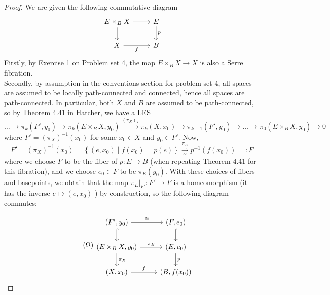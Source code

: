 \documentclass[reqno]{amsart}
\theoremstyle{definition}
\theoremstyle{remark}
\begin{document}
    \begin{proof}
        We are given the following commutative diagram
        \begin{equation*}
        \begin{tikzcd}
            E \times_B X \ar[r] \ar[d] & E \ar[d, "p"] \\
            X \ar[r, "f"'] & B
        \end{tikzcd}
        \end{equation*}
        Firstly, by Exercise 1 on Problem set 4, 
        the map
        $E \times_B X \to X$ is also a
        Serre fibration.\\
        Secondly, by assumption in the conventions section
        for problem set 4, all spaces
        are assumed to be locally path-connected and connected,
        hence all spaces are path-connected. In 
        particular, both $X$ and $B$ are assumed to be
        path-connected, so
        by Theorem 4.41 in Hatcher, we have a LES
        \[
        \ldots \to 
        \pi_k (F',y_0) \to 
        \pi_k(E \times_B X, y_0) 
        \stackrel{(\pi_X)_*}{\to} \pi_k (X,x_0)
        \to \pi_{k-1}(F',y_0) \to \ldots \to 
        \pi_0 \left( E \times_B X, y_0 \right)  \to 0
        \] 
        where
        $F' = \left( \pi_X \right)^{-1}(x_0)$ for
        some $x_0 \in X$
        and $y_0 \in F'$.
        Now,
        \[
        F' = 
        \left( \pi_X \right)^{-1}(x_0)
        = \left\{ \left( e,x_0 \right)  \mid 
        f(x_0) = p(e)  \right\} 
        \xrightarrow[\cong]{\pi_E}  p^{-1}\left( f(x_0) \right) =: 
        F
        \] 
        where we choose $F$ to be
        the fiber of $p \colon E \to B$ (when repeating
        Theorem 4.41 for this fibration), and
        we choose 
        $e_0 \in F$ to be
        $\pi_E (y_0)$.
        With these choices of fibers and basepoints, we
        obtain that the map
        $\pi_E|_{F'} \colon F' \to F$ is a homeomorphism
        (it has the inverse
        $e \mapsto (e, x_0)$ )
        by construction, so the following
        diagram commutes:

        \begin{equation*}\tag{$\Omega$}\label{Omega}
        \begin{tikzcd}
            (F',y_0) \ar[r, "\cong"] \ar[d, hookrightarrow]
            & (F,e_0) \ar[d, hookrightarrow] \\
            (E \times_B X, y_0) \ar[d, "\pi_X"] \ar[r, "\pi_E"]
            & (E,e_0) \ar[d, "p"] \\
            (X,x_0) \ar[r, "f"] & (B,f(x_0))
        \end{tikzcd}
        \end{equation*}
        



\end{proof}
\end{document}
